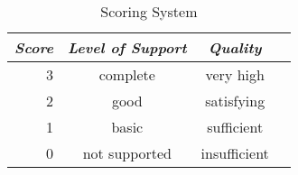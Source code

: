\begin{table}
\caption{Scoring System}
\label{tab:scoring}
\centering
\setlength{\tabcolsep}{5mm} %
\def\arraystretch{1.25} %
\begin{tabular}{|r||c|c|c|} \hline
 \emph{Score} & \emph{Level of Support} & \emph{Quality}\\
\hline\hline
3 & complete & very high \\
\hline
2 & good & satisfying \\
\hline
1 & basic & sufficient \\
\hline
0 & not supported & insufficient \\
\hline
\end{tabular}
\end{table}


% 




